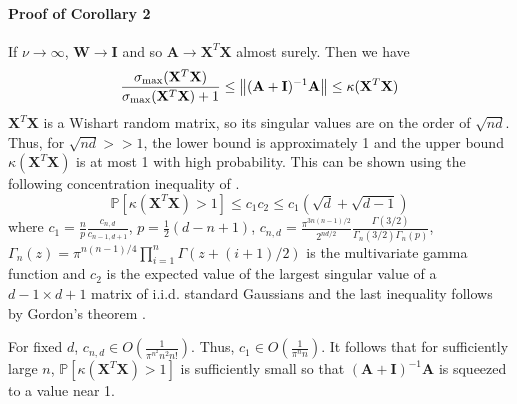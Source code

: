 \documentclass[mnsc,blindrev]{informs3}
\begin{document}
    
        \paragraph{Proof of Corollary 2}
            If $\nu \rightarrow \infty$, $\mathbf{W} \rightarrow \mathbf{I}$ and so $\mathbf{A} \rightarrow \mathbf{X}^T \mathbf{X}$ almost surely. Then we have 
            \begin{equation*}
                \frac{\sigma_{\max}(\mathbf{X}^T \mathbf{X})}{\sigma_{\max}(\mathbf{X}^T \mathbf{X})+1} \leq \norm{(\mathbf{A} + \mathbf{I})^{-1}\mathbf{A}} \leq  \kappa(\mathbf{X}^T \mathbf{X})%
            \end{equation*}
            $\mathbf{X}^T \mathbf{X}$ is a Wishart random matrix, so its singular values are on the order of $\sqrt{nd}$. Thus, for $\sqrt{nd} >> 1$, the lower bound is approximately 1 and the upper bound $\kappa(\mathbf{X}^T \mathbf{X})$ is at most 1 with high probability.  
            This can be shown using the following concentration inequality of \citep{edelman2005tails}.
            \begin{equation*}
                \mathds{P}[\kappa(\mathbf{X}^T \mathbf{X}) > 1] \leq c_1 c_2 \leq c_1 (\sqrt{d} + \sqrt{d-1})%
            \end{equation*}
            where $c_1 = \frac{n}{p} \frac{c_{n,d}}{c_{n-1,d+1}}$, $p=\frac{1}{2}(d-n+1)$, $c_{n,d} = \frac{\pi^{3n(n-1)/2}}{2^{nd/2}} \frac{\Gamma(3/2)}{\Gamma_n(3/2)\Gamma_n(p)}$, $\Gamma_n(z) = \pi^{n(n-1)/4} \prod_{i=1}^n \Gamma(z + (i+1)/2)$ is the multivariate gamma function and $c_2$ is the expected value of the largest singular value of a $d-1\times d+1$ matrix of i.i.d. standard Gaussians and the last inequality follows by Gordon's theorem \citep{vershynin2012introduction}.
    
            For fixed $d$, $c_{n,d} \in O\left(\frac{1}{\pi^{n^2} n^2 n!}\right)$. Thus, $c_1 \in O\left(\frac{1}{\pi^{n}n}\right)$. It follows that for sufficiently large $n$, $\mathds{P}[\kappa(\mathbf{X}^T \mathbf{X}) > 1]$ is sufficiently small so that $(\mathbf{A} + \mathbf{I})^{-1}\mathbf{A}$ is squeezed to a value near 1. %
    
\end{document}
